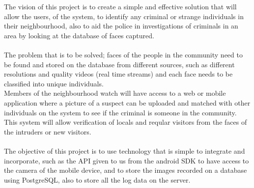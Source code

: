 \documentclass[letterpaper]{article}
\begin{document}
		\vspace{0.2in}
The vision of this project is to create a simple and effective solution that will allow the users, of the system, to identify any criminal or strange individuals in their neighbourhood, also to aid the police in investigations of criminals in an area by looking at the database of faces captured. 
		\\
		\\
The problem that is to be solved; faces of the people in the community need to be found and stored on the database from different sources, such as different resolutions and quality videos (real time streams) and each face needs to be classified into unique individuals. 
\\
Members of the neighbourhood watch will have access to a web or mobile application where a picture of a suspect can be uploaded and matched with other individuals on the system to see if the criminal is someone in the community. This system will allow verification of locals and reqular visitors from the faces of the intruders or new visitors.
		\\
		\\
The objective of this project is to use technology that is simple to integrate and incorporate, such as the API given to us from the android SDK to have access to the camera of the mobile device, and to store the images recorded on a database using PostgreSQL, also to store all the log data on the server.


		
		\vspace{0.2in}
				
		\section*{\colorbox{blue}{}} 
		
		\vspace{0.2in}
		
\end{document}
